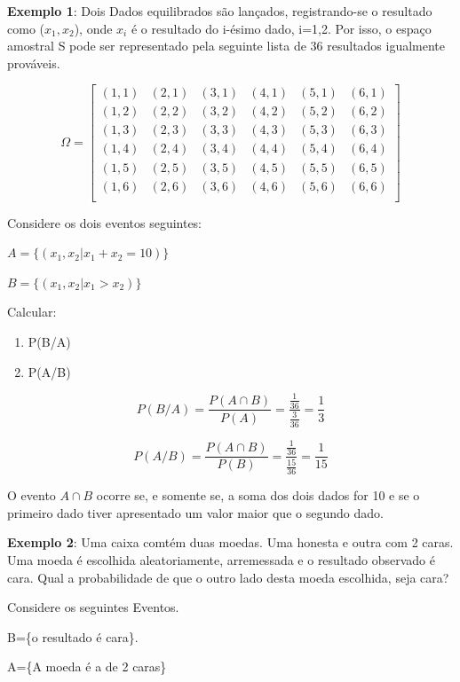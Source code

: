 \documentclass[a4paper,12pt]{report}
\begin{document}
{\textbf{Exemplo 1}: Dois Dados equilibrados são lançados,
registrando-se o resultado como ($x_{1},x_{2}$), onde $x_{i}$ é o
resultado do i-ésimo dado, i=1,2. Por isso, o espaço amostral S
pode ser representado pela seguinte lista de 36 resultados
igualmente prováveis.


$$
\Omega =
\left[%
\begin{array}{cccccc}
  (1,1) & (2,1) & (3,1) & (4,1) & (5,1) & (6,1) \\
  (1,2) & (2,2) & (3,2) & (4,2) & (5,2) & (6,2) \\
  (1,3) & (2,3) & (3,3) & (4,3) & (5,3) & (6,3) \\
  (1,4) & (2,4) & (3,4) & (4,4) & (5,4) & (6,4) \\
  (1,5) & (2,5) & (3,5) & (4,5) & (5,5) & (6,5) \\
  (1,6) & (2,6) & (3,6) & (4,6) & (5,6) & (6,6) \\
\end{array}%
\right]
$$

Considere os dois eventos seguintes:\vskip0.3cm

$A=\{(x_{1},x_{2}|x_{1}+x_{2}=10)\}$

$B=\{(x_{1},x_{2}|x_{1}>x_{2})\}$

\vskip0.3cm

Calcular:

\begin{enumerate}
    \item P(B/A)
    \item P(A/B)
\end{enumerate}


$$P(B/A)=\frac{P(A \cap
B)}{P(A)}=\frac{\frac{1}{36}}{\frac{3}{36}} = \frac{1}{3}$$


$$P(A/B)=\frac{P(A \cap
B)}{P(B)}=\frac{\frac{1}{36}}{\frac{15}{36}} = \frac{1}{15}$$

O evento $A \cap B$ ocorre se, e somente se, a soma dos dois dados
for 10 e se o primeiro dado tiver apresentado um valor maior que o
segundo dado.\vskip0.3cm


\textbf{Exemplo 2}: Uma caixa comtém duas moedas. Uma honesta e
outra com 2 caras. Uma moeda é escolhida aleatoriamente,
arremessada e o resultado observado é cara. Qual a probabilidade
de que o outro lado desta moeda escolhida, seja cara?\vskip0.3cm

Considere os seguintes Eventos.\vskip0.3cm

B=\{o resultado é cara\}.

A=\{A moeda é a de 2 caras\}

}
\end{document}
